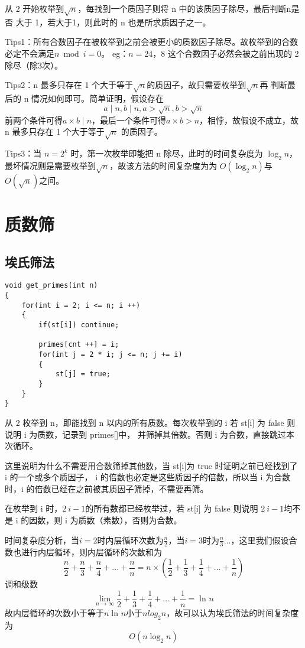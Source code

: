 \documentclass[]{book}
\begin{document}
从 2 开始枚举到$\sqrt{n}$，每找到一个质因子则将 n 中的该质因子除尽，最后判断n是否
大于 1，若大于1，则此时的 n 也是所求质因子之一。

Tips1：所有合数因子在被枚举到之前会被更小的质数因子除尽。故枚举到的合数必定不会满足$n \bmod i = 0$。
eg：$n = 24$，8 这个合数因子必然会被之前出现的 2 除尽（除3次）。

Tips2：n 最多只存在 1 个大于等于$\sqrt{n}$的质因子，故只需要枚举到$\sqrt{n}$再
判断最后的 n 情况如何即可。简单证明，假设存在
$$ a \mid n, b \mid n, a>\sqrt{n}, b>\sqrt{n}$$
前两个条件可得$a \times b \mid n$，最后一个条件可得$a \times b > n$，相悖，故假设不成立，故 n 最多只存在
1 个大于等于$ \sqrt{n}$ 的质因子。

Tips3：当 $n = 2^k$ 时，第一次枚举即能把 n 除尽，此时的时间复杂度为 $\log_{2}{n}$，
最坏情况则是需要枚举到$\sqrt{n}$，故该方法的时间复杂度为为 $O(\log_{2}{n})$与$O(\sqrt{n})$之间。
\section{质数筛}
\subsection{埃氏筛法}
\begin{lstlisting}
void get_primes(int n)
{
    for(int i = 2; i <= n; i ++)
    {
        if(st[i]) continue;
        
        primes[cnt ++] = i;
        for(int j = 2 * i; j <= n; j += i)
        {
            st[j] = true;
        }
    }
}
\end{lstlisting}

从 2 枚举到 n，即能找到 n 以内的所有质数。每次枚举到的 i 若 st[i] 为 false 则说明 i 为质数，记录到 primes[]中，
并筛掉其倍数。否则 i 为合数，直接跳过本次循环。

这里说明为什么不需要用合数筛掉其他数，当 st[i]为 true 时证明之前已经找到了 i 的一个或多个质因子，
i 的倍数也必定是这些质因子的倍数，所以当 i 为合数时，i 的倍数已经在之前被其质因子筛掉，不需要再筛。

在枚举到 i 时，$2 ~ i-1$的所有数都已经枚举过，若 st[i] 为 false 则说明 $2 ~ i-1$均不是 i 的因数，则 i 为质数（素数），否则为合数。

时间复杂度分析，当$i=2$时内层循环次数为$\frac{n}{2}$，当$i=3$时为$\frac{n}{3}$...，这里我们假设合数也进行内层循环，则内层循环的次数和为
$$ \frac{n}{2} + \frac{n}{3} + \frac{n}{4} + ... + \frac{n}{n} = n \times (\frac{1}{2} + \frac{1}{3} + \frac{1}{4} + ... + \frac{1}{n})$$
调和级数
$$\lim_{n \to \infty} \frac{1}{2} + \frac{1}{3} + \frac{1}{4} + ... + \frac{1}{n} = \ln_{}{n} $$
故内层循环的次数小于等于$n\ln_{}{n}$小于$nlog_{2}{n}$，故可以认为埃氏筛法的时间复杂度为
$$O(n\log_{2}{n})$$
\end{document}
